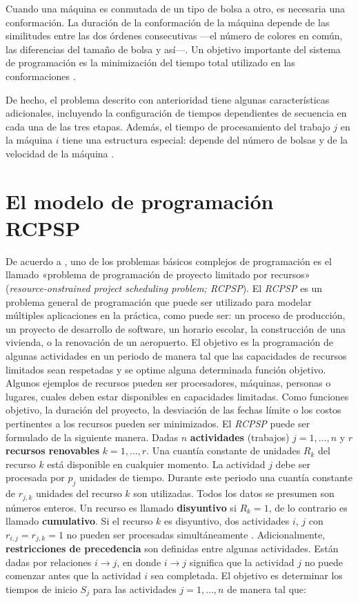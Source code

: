 \documentclass[spanish,draft,12pt,headsepline,footsepline,paper=letter]{scrreprt}
\begin{document}
Cuando una máquina es conmutada de un tipo de bolsa a otro, es necesaria una conformación. La duración de la conformación de la máquina depende de las similitudes entre las dos órdenes consecutivas —el número de colores en común, las diferencias del tamaño de bolsa y así—. Un objetivo importante del sistema de programación es la minimización del tiempo total utilizado en las conformaciones \citep[p.~2]{Pinedo1995}.

De hecho, el problema descrito con anterioridad tiene algunas características adicionales, incluyendo la configuración de tiempos dependientes de secuencia en cada una de las tres etapas. Además, el tiempo de procesamiento del trabajo $j$ en la máquina $i$ tiene una estructura especial: depende del número de bolsas y de la velocidad de la máquina \citep[p.~2]{Pinedo1995}.

\section{El modelo de programación RCPSP}

De acuerdo a \citet[p.~2]{Robert2010}, uno de los problemas básicos complejos de programación es el llamado «problema de programación de proyecto limitado por recursos» (\textit{resource-onstrained project scheduling problem; RCPSP}). El \textit{RCPSP} es un problema general de programación que puede ser utilizado para modelar múltiples aplicaciones en la práctica, como puede ser: un proceso de producción, un proyecto de desarrollo de software, un horario escolar, la construcción de una vivienda, o la renovación de un aeropuerto. El objetivo es la programación de algunas actividades en un periodo de manera tal que las capacidades de recursos limitados sean respetadas y se optime alguna determinada función objetivo. Algunos ejemplos de recursos pueden ser procesadores, máquinas, personas o lugares, cuales deben estar disponibles en capacidades limitadas. Como funciones objetivo, la duración del proyecto, la desviación de las fechas límite o los costos pertinentes a los recursos pueden ser minimizados.
El \textit{RCPSP} puede ser formulado de la siguiente manera. Dadas $n$ \textbf{actividades} (trabajos) $j=1,\dots,n$ y $r$ \textbf{recursos renovables} $k=1,\dots,r$. Una cuantía constante de unidades $R_k$ del recurso $k$ está disponible en cualquier momento. La actividad $j$ debe ser procesada por $p_j$ unidades de tiempo. Durante este periodo una cuantía constante de $r_{j,k}$ unidades del recurso $k$ son utilizadas. Todos los datos se presumen son números enteros. Un recurso es llamado \textbf{disyuntivo} si $R_k=1$, de lo contrario es llamado \textbf{cumulativo}. Si el recurso $k$ es disyuntivo, dos actividades $i$, $j$ con $r_{i,j}=r_{j,k}=1$ no pueden ser procesadas simultáneamente \citep[p.~2]{Robert2010}.
Adicionalmente, \textbf{restricciones de precedencia} son definidas entre algunas actividades. Están dadas por relaciones $i \to j$, en donde $i \to j$ significa que la actividad $j$ no puede comenzar antes que la actividad $i$ sea completada. El objetivo es determinar los tiempos de inicio $S_j$ para las actividades $j=1,\dots,n$ de manera tal que:
\end{document}
